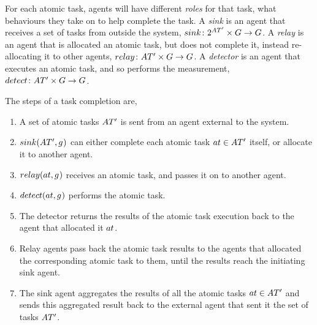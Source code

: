 
For each atomic task, agents will have different \textit{roles} for that task,  what behaviours they take on to help complete the task. A \textit{sink} is an agent that  receives a set of tasks from outside the system, $\formalSinkRole{}{}$. A \textit{relay} is an agent that is allocated an atomic task, but does not complete it, instead re-allocating it to other agents, $\formalRelayRole{}{}$. A \textit{detector} is an agent that  executes an atomic task, and so performs the measurement, $\formalDetectorRole{}{}$.

The steps of a task completion are,

\begin{enumerate}
	\item A set of atomic tasks $\setAtomicTaskInstance{}{}$ is sent from an agent external to the system.
	\item  $\functionSinkRole{}{}$ can either complete each atomic task $
	\varAtomicTask{}{} \in \setAtomicTaskInstance{}{}$ itself, or allocate it to another agent.
	 \item $\functionRelayRole{}{}$ receives an atomic task, and passes it on to another agent.
	 \item $\functionDetectorRole{}{}$ performs the atomic task.
	 \item The detector returns the results of the atomic task execution back to the agent that allocated it $\varAtomicTask{}{}$.
	 \item Relay agents pass back the atomic task results to the agents that allocated the corresponding atomic task to them, until the results reach the initiating sink agent.
	 \item The sink agent aggregates the results of all the atomic tasks $ \varAtomicTask{}{} \in \setAtomicTaskInstance{}{}$ and sends this aggregated result back to the external agent that sent it the set of tasks $\setAtomicTaskInstance{}{}$.
\end{enumerate}

